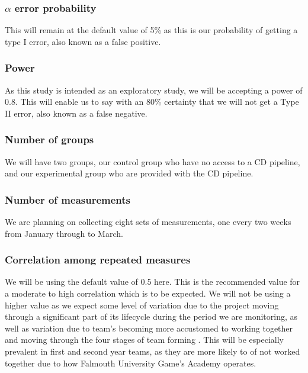 \documentclass[lettersize,journal]{IEEEtran}
\begin{document}
        \subsubsection*{$\alpha$ error probability}
            This will remain at the default value of 5\% as this is our probability of getting a type I error, also known as a false positive\cite{errortype}.\\

        \subsubsection*{Power}
            As this study is intended as an exploratory study, we will be accepting a power of 0.8. This will enable us to say with an 80\% certainty that we will not get a Type II error, also known as a false negative\cite{errortype}.\\

        \subsubsection*{Number of groups}
            We will have two groups, our control group who have no access to a CD pipeline, and our experimental group who are provided with the CD pipeline.\\

        \subsubsection*{Number of measurements}
            We are planning on collecting eight sets of measurements, one every two weeks from January through to March.\\
            
        \subsubsection*{Correlation among repeated measures}
            We will be using the default value of 0.5 here. This is the recommended value for a moderate to high correlation \cite{gpowerguide} which is to be expected. We will not be using a higher value as we expect some level of variation due to the project moving through a significant part of its lifecycle during the period we are monitoring, as well as variation due to team's becoming more accustomed to working together and moving through the four stages of team forming \cite{tuckman1965developmental}. This will be especially prevalent in first and second year teams, as they are more likely to of not worked together due to how Falmouth University Game's Academy operates.\\
\end{document}
